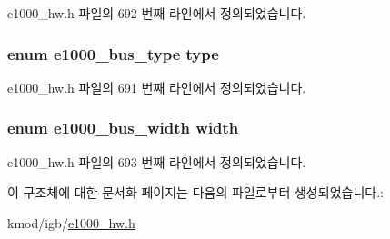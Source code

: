 e1000\+\_\+hw.\+h 파일의 692 번째 라인에서 정의되었습니다.

\subsubsection[{\texorpdfstring{type}{type}}]{\setlength{\rightskip}{0pt plus 5cm}enum {\bf e1000\+\_\+bus\+\_\+type} type}\hypertarget{structe1000__bus__info_a1d586fc95f0743ade8be0fa150e61135}{}\label{structe1000__bus__info_a1d586fc95f0743ade8be0fa150e61135}


e1000\+\_\+hw.\+h 파일의 691 번째 라인에서 정의되었습니다.

\subsubsection[{\texorpdfstring{width}{width}}]{\setlength{\rightskip}{0pt plus 5cm}enum {\bf e1000\+\_\+bus\+\_\+width} width}\hypertarget{structe1000__bus__info_af18553c0e03f32b4280b24a1ab40071a}{}\label{structe1000__bus__info_af18553c0e03f32b4280b24a1ab40071a}


e1000\+\_\+hw.\+h 파일의 693 번째 라인에서 정의되었습니다.



이 구조체에 대한 문서화 페이지는 다음의 파일로부터 생성되었습니다.\+:\begin{DoxyCompactItemize}
\item 
kmod/igb/\hyperlink{kmod_2igb_2e1000__hw_8h}{e1000\+\_\+hw.\+h}\end{DoxyCompactItemize}
